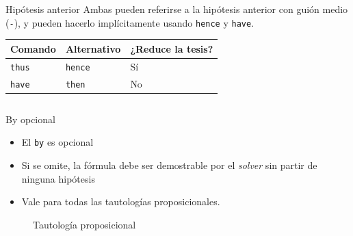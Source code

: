 \documentclass[xcolor={dvipsnames},spanish]{beamer}
\begin{document}
\begin{frame}[fragile]{Hipótesis anterior}
    Ambas pueden referirse a la hipótesis anterior con guión medio
    (\lstinline{-}), y pueden hacerlo implícitamente usando \lstinline{hence} y
    \lstinline{have}.

    \begin{table}[H]
        \centering
    \begin{tabular}{l|l|l}
    Comando             & Alternativo             & ¿Reduce la tesis? \\
    \hline
    \lstinline|thus|    & \lstinline|hence|       & Sí               \\
    \lstinline|have|    & \lstinline|then|        & No              
    \end{tabular}
    \end{table}

    \begin{columns}
        \begin{column}{0.5\textwidth}
        
        \end{column}
        \begin{column}{0.5\textwidth}
            
        \end{column}
    \end{columns}
\end{frame}

\begin{frame}[fragile]{By opcional}
    \begin{itemize}
        \item El \lstinline{by} es opcional
        \item Si se omite, la fórmula debe ser
        demostrable por el \textit{solver} sin partir de ninguna hipótesis
        \item Vale para todas las tautologías proposicionales.
    \end{itemize}

    \begin{figure}[H]
        \centering
        \small Tautología proposicional
        
        \begin{tabular}{c}
            
        \end{tabular}
    \end{figure}
\end{frame}
\end{document}
